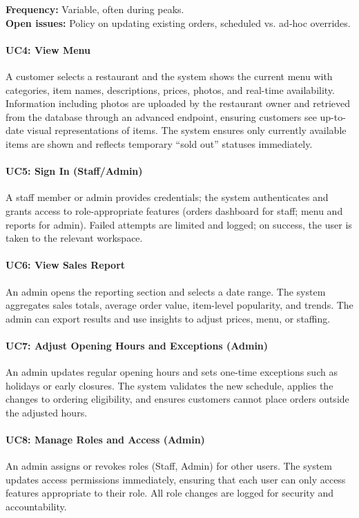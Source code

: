 \documentclass{article}
\begin{document}
\textbf{Frequency:} Variable, often during peaks.\\
\textbf{Open issues:} Policy on updating existing orders, scheduled vs. ad-hoc overrides.




\paragraph{UC4: View Menu}  
A customer selects a restaurant and the system shows the current menu with categories, item names, descriptions, prices, photos, and real-time availability. Information including photos are uploaded by the restaurant owner and retrieved from the database through an advanced endpoint, ensuring customers see up-to-date visual representations of items. The system ensures only currently available items are shown and reflects temporary “sold out” statuses immediately.

\paragraph{UC5: Sign In (Staff/Admin)}  
A staff member or admin provides credentials; the system authenticates and grants access to role-appropriate features (orders dashboard for staff; menu and reports for admin). Failed attempts are limited and logged; on success, the user is taken to the relevant workspace.

\paragraph{UC6: View Sales Report}  
An admin opens the reporting section and selects a date range. The system aggregates sales totals, average order value, item-level popularity, and trends. The admin can export results and use insights to adjust prices, menu, or staffing.

\paragraph{UC7: Adjust Opening Hours and Exceptions (Admin)}  
An admin updates regular opening hours and sets one-time exceptions such as holidays or early closures. The system validates the new schedule, applies the changes to ordering eligibility, and ensures customers cannot place orders outside the adjusted hours.

\paragraph{UC8: Manage Roles and Access (Admin)}  
An admin assigns or revokes roles (Staff, Admin) for other users. The system updates access permissions immediately, ensuring that each user can only access features appropriate to their role. All role changes are logged for security and accountability.
\end{document}
